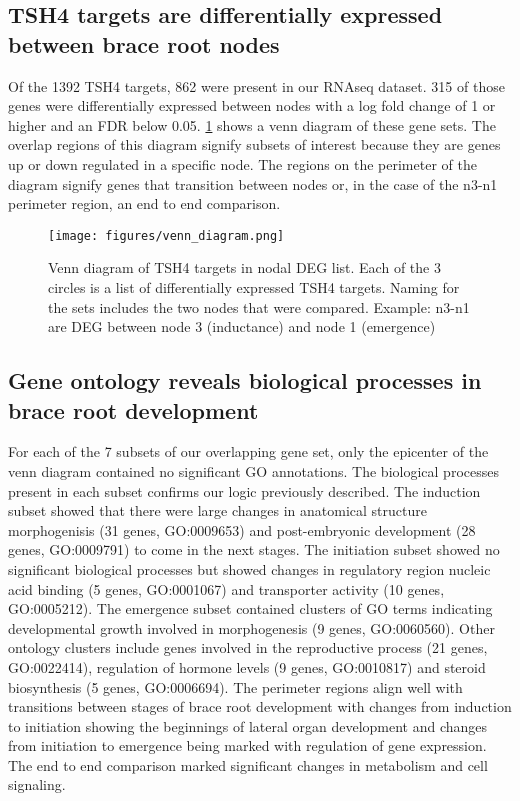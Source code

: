 \subsection{TSH4 targets are differentially expressed between brace root nodes}
Of the 1392 TSH4 targets, 862 were present in our RNAseq dataset. 315 of those genes were differentially expressed between nodes with a log fold change of 1 or higher and an FDR below 0.05. \ref{fig:Venn1} shows a venn diagram of these gene sets. The overlap regions of this diagram signify subsets of interest because they are genes up or down regulated in a specific node. The regions on the perimeter of the diagram signify genes that transition between nodes or, in the case of the n3-n1 perimeter region, an end to end comparison. 
\begin{figure}[H]
    \centering
    \begin{mdframed}[backgroundcolor=green!20]
    \centering
    \texttt{[image: figures/venn\_diagram.png]}
    \caption{Venn diagram of TSH4 targets in nodal DEG list. Each of the 3 circles is a list of differentially expressed TSH4 targets. Naming for the sets includes the two nodes that were compared. Example: n3-n1 are DEG between node 3 (inductance) and node 1 (emergence)}
    \label{fig:Venn1}
    \end{mdframed}
\end{figure}

\subsection{Gene ontology reveals biological processes in brace root development}
For each of the 7 subsets of our overlapping gene set, only the epicenter of the venn diagram contained no significant GO annotations. The biological processes present in each subset confirms our logic previously described. The induction subset showed that there were large changes in anatomical structure morphogenisis (31 genes, GO:0009653) and post-embryonic development (28 genes, GO:0009791) to come in the next stages. The initiation subset showed no significant biological processes but showed changes in regulatory region nucleic acid binding (5 genes, GO:0001067) and transporter activity (10 genes, GO:0005212).  
The emergence subset contained clusters of GO terms indicating developmental growth involved in morphogenesis (9 genes, GO:0060560). Other ontology clusters include genes involved in the reproductive process (21 genes, GO:0022414), regulation of hormone levels (9 genes, GO:0010817) and steroid biosynthesis (5 genes, GO:0006694). The perimeter regions align well with transitions between stages of brace root development with changes from induction to initiation showing the beginnings of lateral organ development and changes from initiation to emergence being marked with regulation of gene expression. The end to end comparison marked significant changes in metabolism and cell signaling.   
